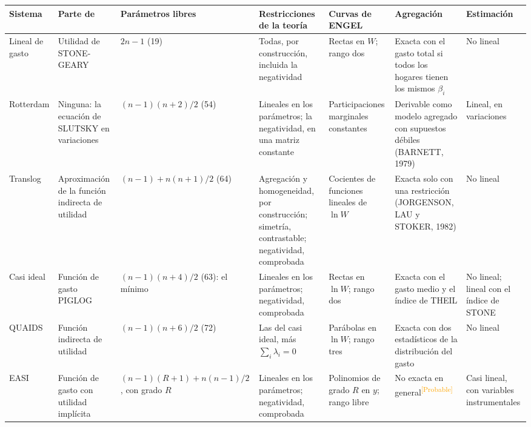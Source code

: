 \documentclass[10pt,a4paper]{article}
\begin{document}
\begin{center}
\small
\setlength{\tabcolsep}{3pt}
\renewcommand{\arraystretch}{1.4}
\begin{tabular}{|p{1.5cm}|p{1.9cm}|p{2.5cm}|p{2.2cm}|p{1.9cm}|p{2.1cm}|p{1.9cm}|}
    \hline
    \centering\textbf{Sistema} & \centering\textbf{Parte de} & \centering\textbf{Parámetros libres} & \centering\textbf{Restricciones de la teoría} & \centering\textbf{Curvas de ENGEL} & \centering\textbf{Agregación} & \centering\textbf{Estimación}\tabularnewline
    \hline
    \raggedright Lineal de gasto & \raggedright Utilidad de STONE-GEARY & \raggedright $2n-1$ (19) & \raggedright Todas, por construcción, incluida la negatividad & \raggedright Rectas en $W$; rango dos & \raggedright Exacta con el gasto total si todos los hogares tienen los mismos $\beta_i$ & \raggedright No lineal\tabularnewline
    \hline
    \raggedright Rotterdam & \raggedright Ninguna: la ecuación de SLUTSKY en variaciones & \raggedright ${(n-1)(n+2)/2}$ (54) & \raggedright Lineales en los parámetros; la negatividad, en una matriz constante & \raggedright Participaciones marginales constantes & \raggedright Derivable como modelo agregado con supuestos débiles (BARNETT, 1979) & \raggedright Lineal, en variaciones\tabularnewline
    \hline
    \raggedright Translog & \raggedright Aproximación de la función indirecta de utilidad & \raggedright ${(n-1)}+{n(n+1)/2}$ (64) & \raggedright Agregación y homogeneidad, por construcción; simetría, contrastable; negatividad, comprobada & \raggedright Cocientes de funciones lineales de $\ln W$ & \raggedright Exacta solo con una restricción (JORGENSON, LAU y STOKER, 1982) & \raggedright No lineal\tabularnewline
    \hline
    \raggedright Casi ideal & \raggedright Función de gasto PIGLOG & \raggedright ${(n-1)(n+4)/2}$ (63): el mínimo & \raggedright Lineales en los parámetros; negatividad, comprobada & \raggedright Rectas en $\ln W$; rango dos & \raggedright Exacta con el gasto medio y el índice de THEIL & \raggedright No lineal; lineal con el índice de STONE\tabularnewline
    \hline
    \raggedright QUAIDS & \raggedright Función indirecta de utilidad & \raggedright ${(n-1)(n+6)/2}$ (72) & \raggedright Las del casi ideal, más $\sum_i\lambda_i=0$ & \raggedright Parábolas en $\ln W$; rango tres & \raggedright Exacta con dos estadísticos de la distribución del gasto & \raggedright No lineal\tabularnewline
    \hline
    \raggedright EASI & \raggedright Función de gasto con utilidad implícita & \raggedright ${(n-1)(R+1)}+{n(n-1)/2}$, con grado $R$ & \raggedright Lineales en los parámetros; negatividad, comprobada & \raggedright Polinomios de grado $R$ en $y$; rango libre & \raggedright No exacta en general\textcolor{orange}{\textsuperscript{[Probable]}} & \raggedright Casi lineal, con variables instrumentales\tabularnewline
    \hline
\end{tabular}
\end{center}
\end{document}
